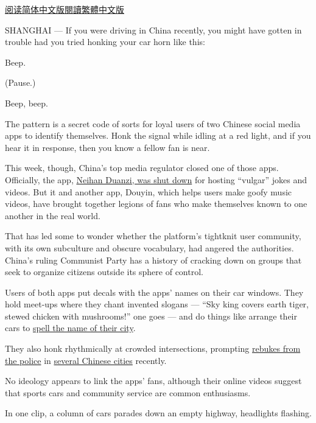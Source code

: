 \href{https://cn.nytimes.com/business/20180413/china-bytedance-duanzi-censor/}{阅读简体中文版}\href{https://cn.nytimes.com/business/20180413/china-bytedance-duanzi-censor/zh-hant/}{閱讀繁體中文版}

SHANGHAI --- If you were driving in China recently, you might have
gotten in trouble had you tried honking your car horn like this:

Beep.

(Pause.)

Beep, beep.

The pattern is a secret code of sorts for loyal users of two Chinese
social media apps to identify themselves. Honk the signal while idling
at a red light, and if you hear it in response, then you know a fellow
fan is near.

This week, though, China's top media regulator closed one of those apps.
Officially, the app,
\href{https://www.nytimes.com/2018/04/11/technology/china-toutiao-bytedance-censor.html}{Neihan
Duanzi, was shut down} for hosting ``vulgar'' jokes and videos. But it
and another app, Douyin, which helps users make goofy music videos, have
brought together legions of fans who make themselves known to one
another in the real world.

That has led some to wonder whether the platform's tightknit user
community, with its own subculture and obscure vocabulary, had angered
the authorities. China's ruling Communist Party has a history of
cracking down on groups that seek to organize citizens outside its
sphere of control.

Users of both apps put decals with the apps' names on their car windows.
They hold meet-ups where they chant invented slogans --- ``Sky king
covers earth tiger, stewed chicken with mushrooms!'' one goes --- and do
things like arrange their cars to
\href{http://news.163.com/18/0412/02/DF5L0HNN000187R2.html}{spell the
name of their city}.

They also honk rhythmically at crowded intersections, prompting
\href{http://news.bandao.cn/news_html/201804/20180411/news_20180411_2820484.shtml}{rebukes
from the police} in
\href{http://news.cnwest.com/content/2018-04/07/content_15758620.htm}{several
Chinese cities} recently.

No ideology appears to link the apps' fans, although their online videos
suggest that sports cars and community service are common enthusiasms.

In one clip, a column of cars parades down an empty highway, headlights
flashing.

